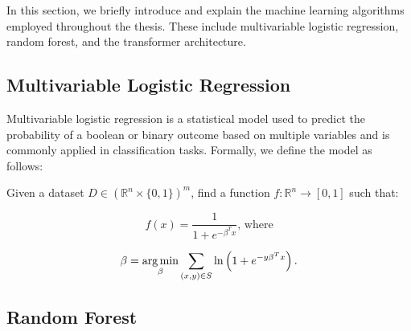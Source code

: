 In this section, we briefly introduce and explain the machine learning algorithms employed throughout the thesis. These include multivariable logistic regression, random forest, and the transformer architecture.

\subsection{Multivariable Logistic Regression}

Multivariable logistic regression is a statistical model used to predict the probability of a boolean or binary outcome based on multiple variables and is commonly applied in classification tasks. Formally, we define the model as follows:

\begin{definition}
    Given a dataset $D \in (\mathbb{R}^n \times \{0, 1\})^m$, find a function $f: \mathbb{R}^n \rightarrow [0, 1]$ such that:

    \[
        f(x) = \frac{1}{1 + e^{-\beta^T x}} \text{, where}
    \]


    \[
        \beta = \operatorname*{arg\,min}_{\beta} \sum_{(x, y) \in S} \ln \left( 1  + e^{-y \beta^T x} \right).
    \]
\end{definition}

    



\subsection{Random Forest}

